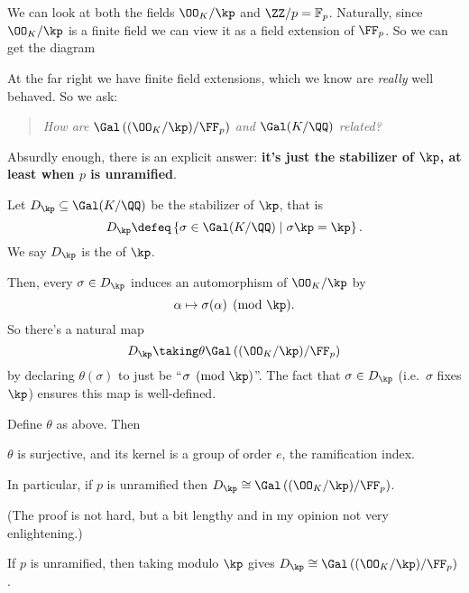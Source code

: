 We can look at both the fields $\OO_K / \kp$ and $\ZZ / p = \mathbb F_p$.
Naturally, since $\OO_K / \kp$ is a finite field we can view it as a field extension of $\FF_p$.
So we can get the diagram
\begin{center}
\end{center}
At the far right we have finite field extensions, which we know are \emph{really} well behaved.
So we ask:
\begin{quote}
	\itshape
	How are $\Gal\left( (\OO_K/\kp) / \FF_p \right)$
	and $\Gal(K/\QQ)$ related?
\end{quote}
Absurdly enough, there is an explicit answer:
\textbf{it's just the stabilizer of $\kp$, at least when
$p$ is unramified}.
\begin{definition}
	Let $D_\kp \subseteq \Gal(K/\QQ)$ be the stabilizer of $\kp$, that is
	\[ D_\kp \defeq \left\{ \sigma \in \Gal(K/\QQ) \mid \sigma\kp = \kp \right\}. \]
	We say $D_\kp$ is the  of $\kp$.
\end{definition}
Then, every $\sigma \in D_\kp$ induces an automorphism of $\OO_K / \kp$ by
\[ \alpha \mapsto \sigma(\alpha) \pmod\kp. \]
So there's a natural map
\[ D_\kp \taking\theta \Gal\left( (\OO_K/\kp) / \FF_p \right) \]
by declaring $\theta(\sigma)$ to just be ``$\sigma \pmod \kp$''.
The fact that $\sigma \in D_\kp$ (i.e.\ $\sigma$ fixes $\kp$)
ensures this map is well-defined.

\begin{theorem}
	\label{thm:decomposition}
	Define $\theta$ as above. Then
	\begin{itemize}
		\ii $\theta$ is surjective, and
		\ii its kernel is a group of order $e$,
		the ramification index.
	\end{itemize}
	In particular, if $p$ is unramified then
	$D_\kp \cong \Gal\left( (\OO_K/\kp)/\FF_p \right)$.
\end{theorem}
(The proof is not hard, but a bit lengthy and in my opinion
not very enlightening.)

\begin{moral}
	If $p$ is unramified, then taking
	modulo $\kp$ gives
	$D_\kp \cong \Gal\left( (\OO_K/\kp) / \FF_p \right)$.
\end{moral}

